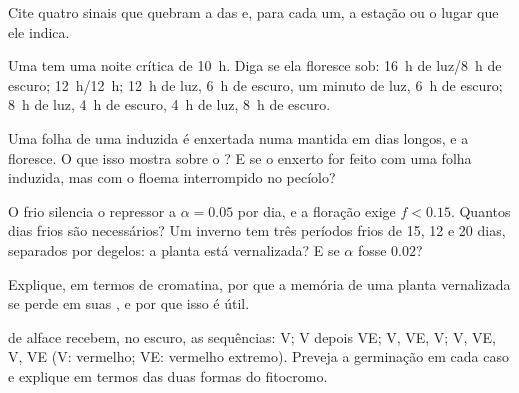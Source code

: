 \begin{exercise}[$\star$]\label{exo:b2:plant-flowering:4}
Cite quatro sinais que quebram a  das  e, para cada
um, a estação ou o lugar que ele indica.
\end{exercise}

\begin{exercise}[$\star\star$]\label{exo:b2:plant-flowering:5}
Uma  tem uma noite crítica de \qty{10}{h}. Diga se
ela floresce sob: \qty{16}{h} de luz/\qty{8}{h} de escuro;
\qty{12}{h}/\qty{12}{h}; \qty{12}{h} de luz, \qty{6}{h} de escuro, um
minuto de luz, \qty{6}{h} de escuro; \qty{8}{h} de luz, \qty{4}{h} de
escuro, \qty{4}{h} de luz, \qty{8}{h} de escuro.
\end{exercise}

\begin{exercise}[$\star\star$]\label{exo:b2:plant-flowering:6}
Uma folha de uma  induzida é enxertada numa  mantida em dias longos, e a  floresce. O
que isso mostra sobre o ? E se o enxerto for feito com uma
folha induzida, mas com o floema interrompido no pecíolo?
\end{exercise}

\begin{exercise}[$\star\star$]\label{exo:b2:plant-flowering:7}
O frio silencia o repressor a $\alpha = 0.05$ por dia, e a floração
exige $f < 0.15$. Quantos dias frios são necessários? Um inverno tem
três períodos frios de 15, 12 e 20 dias, separados por degelos: a
planta está vernalizada? E se $\alpha$ fosse $0.02$?
\end{exercise}

\begin{exercise}[$\star\star$]\label{exo:b2:plant-flowering:8}
Explique, em termos de cromatina, por que a memória de uma planta
vernalizada se perde em suas , e por que isso é útil.
\end{exercise}

\begin{exercise}[$\star\star$]\label{exo:b2:plant-flowering:9}
 de alface recebem, no escuro, as sequências: V; V depois VE;
V, VE, V; V, VE, V, VE (V: vermelho; VE: vermelho extremo). Preveja a
germinação em cada caso e explique em termos das duas formas do
fitocromo.
\end{exercise}

